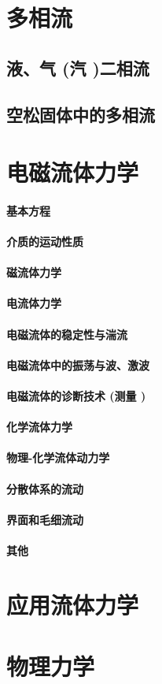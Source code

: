 \documentclass[UTF8]{../../06-Physics}
\begin{document}
\chapter{多相流}
    \section{液、气 (汽 )二相流}
    \section{空松固体中的多相流}


\chapter{电磁流体力学}
    \subsubsection{基本方程}
    \subsubsection{介质的运动性质}
    \subsubsection{磁流体力学}
    \subsubsection{电流体力学}
    \subsubsection{电磁流体的稳定性与湍流}
    \subsubsection{电磁流体中的振荡与波、激波}
    \subsubsection{电磁流体的诊断技术 (测量 )}
    \subsubsection{化学流体力学}
    \subsubsection{物理-化学流体动力学}
    \subsubsection{分散体系的流动}
    \subsubsection{界面和毛细流动}
    \subsubsection{其他}


\chapter{应用流体力学}
\chapter{物理力学}
\end{document}
